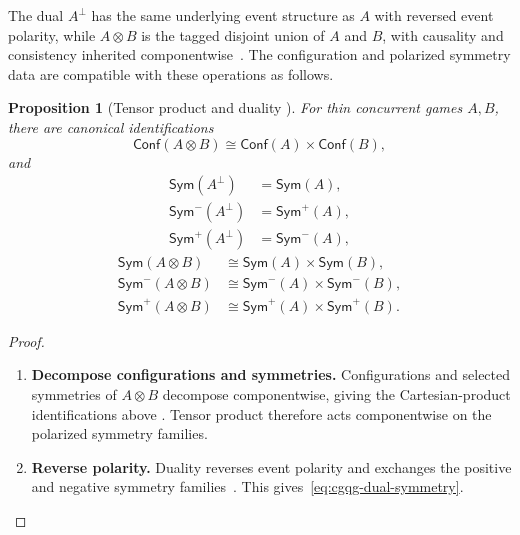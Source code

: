 \documentclass[oneside]{article}
\newcommand{\Conf}{\mathsf{Conf}}
\newcommand{\Sym}{\mathsf{Sym}}
\theoremstyle{plain}
\newtheorem{proposition}[theorem]{Proposition}
\theoremstyle{definition}
\theoremstyle{remark}
\begin{document}
The dual \(A^\perp\) has the same underlying event structure as \(A\) with reversed event polarity, while \(A\otimes B\) is the tagged disjoint union of \(A\) and \(B\), with causality and consistency inherited componentwise~\cite[Def.~2.8 and the following paragraph]{CastellanClairambaultWinskel2019}. The configuration and polarized symmetry data are compatible with these operations as follows.

\begin{proposition}[Tensor product and duality {\cite[Defs.~2.8, 3.5 and \S\S3.2.2--3.3.3]{CastellanClairambaultWinskel2019}}]
\label{prop:cgqg-background-tensor-duality}
    For thin concurrent games \(A,B\), there are canonical identifications
    \begin{equation}
        \Conf(A\otimes B)
        \cong
        \Conf(A)\times\Conf(B),
    \label{eq:cgqg-conf-tensor}
    \end{equation}
    and
    \begin{equation}
 \begin{aligned}
 \Sym(A^\perp)&=\Sym(A),\\
 \Sym^-(A^\perp)&=\Sym^+(A),\\
 \Sym^+(A^\perp)&=\Sym^-(A),
 \end{aligned}
 \label{eq:cgqg-dual-symmetry}
\end{equation}
\begin{equation}
 \begin{aligned}
 \Sym(A\otimes B)&\cong\Sym(A)\times\Sym(B),\\
 \Sym^-(A\otimes B)&\cong\Sym^-(A)\times\Sym^-(B),\\
 \Sym^+(A\otimes B)&\cong\Sym^+(A)\times\Sym^+(B).
 \end{aligned}
 \label{eq:cgqg-tensor-symmetry}
\end{equation}
\end{proposition}
\begin{proof}
    \leavevmode
    \begin{enumerate}[beginpenalty=10000]
        \item \textbf{Decompose configurations and symmetries.} Configurations and selected symmetries of \(A\otimes B\) decompose componentwise, giving the Cartesian-product identifications above \cite[Defs.~2.8 and 3.5]{CastellanClairambaultWinskel2019}. Tensor product therefore acts componentwise on the polarized symmetry families.

        \item \textbf{Reverse polarity.} Duality reverses event polarity and exchanges the positive and negative symmetry families~\cite[\S\S3.2.2--3.3.3]{CastellanClairambaultWinskel2019}. This gives~\eqref{eq:cgqg-dual-symmetry}. \qedhere
    \end{enumerate}
\end{proof}
\end{document}
